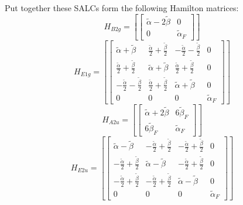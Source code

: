 \documentclass[12pt,a4paper]{article}
\begin{document}
Put together these SALCs form the following Hamilton matrices:
     $$ H_{B2g}= \left[\begin{bmatrix}\tilde{\alpha} - 2 \tilde{\beta} & 0\\0 & \tilde{\alpha}_{F}\end{bmatrix}\right]$$ 
     $$ H_{E1g}= \left[\begin{bmatrix}\tilde{\alpha} + \tilde{\beta} & \frac{\tilde{\alpha}}{2} + \frac{\tilde{\beta}}{2} & - \frac{\tilde{\alpha}}{2} - \frac{\tilde{\beta}}{2} & 0\\\frac{\tilde{\alpha}}{2} + \frac{\tilde{\beta}}{2} & \tilde{\alpha} + \tilde{\beta} & \frac{\tilde{\alpha}}{2} + \frac{\tilde{\beta}}{2} & 0\\- \frac{\tilde{\alpha}}{2} - \frac{\tilde{\beta}}{2} & \frac{\tilde{\alpha}}{2} + \frac{\tilde{\beta}}{2} & \tilde{\alpha} + \tilde{\beta} & 0\\0 & 0 & 0 & \tilde{\alpha}_{F}\end{bmatrix}\right]$$ 
     $$ H_{A2u}= \left[\begin{bmatrix}\tilde{\alpha} + 2 \tilde{\beta} & 6 \tilde{\beta}_{F}\\6 \tilde{\beta}_{F} & \tilde{\alpha}_{F}\end{bmatrix}\right]$$ 
     $$ H_{E2u}= \left[\begin{bmatrix}\tilde{\alpha} - \tilde{\beta} & - \frac{\tilde{\alpha}}{2} + \frac{\tilde{\beta}}{2} & - \frac{\tilde{\alpha}}{2} + \frac{\tilde{\beta}}{2} & 0\\- \frac{\tilde{\alpha}}{2} + \frac{\tilde{\beta}}{2} & \tilde{\alpha} - \tilde{\beta} & - \frac{\tilde{\alpha}}{2} + \frac{\tilde{\beta}}{2} & 0\\- \frac{\tilde{\alpha}}{2} + \frac{\tilde{\beta}}{2} & - \frac{\tilde{\alpha}}{2} + \frac{\tilde{\beta}}{2} & \tilde{\alpha} - \tilde{\beta} & 0\\0 & 0 & 0 & \tilde{\alpha}_{F}\end{bmatrix}\right]$$ 
\end{document}
